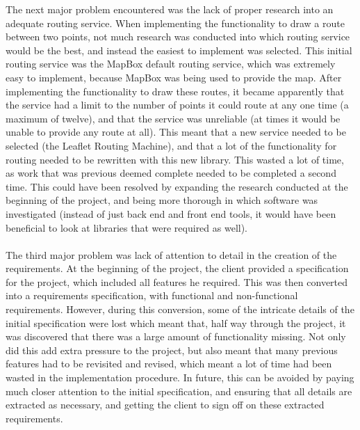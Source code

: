 The next major problem encountered was the lack of proper research into an adequate routing service. When implementing the functionality to draw a route between two points, not much research was conducted into which routing service would be the best, and instead the easiest to implement was selected. This initial routing service was the MapBox default routing service, which was extremely easy to implement, because MapBox was being used to provide the map. After implementing the functionality to draw these routes, it became apparently that the service had a limit to the number of points it could route at any one time (a maximum of twelve), and that the service was unreliable (at times it would be unable to provide any route at all). This meant that a new service needed to be selected (the Leaflet Routing Machine), and that a lot of the functionality for routing needed to be rewritten with this new library. This wasted a lot of time, as work that was previous deemed complete needed to be completed a second time. This could have been resolved by expanding the research conducted at the beginning of the project, and being more thorough in which software was investigated (instead of just back end and front end tools, it would have been beneficial to look at libraries that were required as well). \ \\
\ \\
The third major problem was lack of attention to detail in the creation of the requirements. At the beginning of the project, the client provided a specification for the project, which included all features he required. This was then converted into a requirements specification, with functional and non-functional requirements. However, during this conversion, some of the intricate details of the initial specification were lost which meant that, half way through the project, it was discovered that there was a large amount of functionality missing. Not only did this add extra pressure to the project, but also meant that many previous features had to be revisited and revised, which meant a lot of time had been wasted in the implementation procedure. In future, this can be avoided by paying much closer attention to the initial specification, and ensuring that all details are extracted as necessary, and getting the client to sign off on these extracted requirements.



